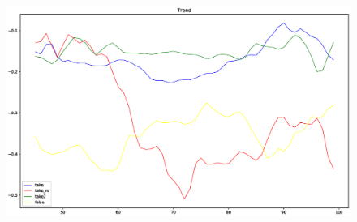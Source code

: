 \documentclass[a4j,twocolumn,10pt]{jarticle}
\begin{document}
\begin{figure}[t]
  \begin{center}
    \includegraphics[width=1\textwidth]{Figure_1.eps}
    \caption{}
    \label{fig}
  \end{center}
\end{figure}
\end{document}
